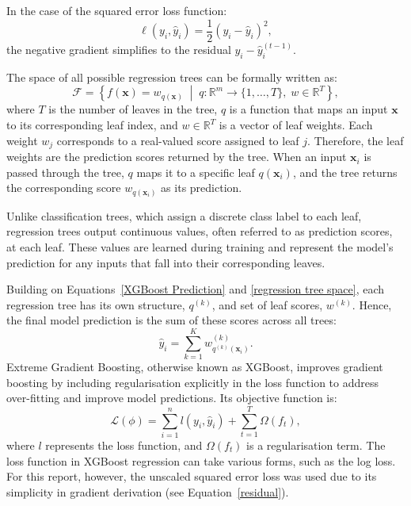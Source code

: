 \documentclass[11pt]{report} %
\begin{document}
\noindent In the case of the squared error loss function:
\begin{equation}
\ell(y_i, \hat{y}_i) = \frac{1}{2}(y_i - \hat{y}_i)^2,
\label{residual}
\end{equation}
the negative gradient simplifies to the residual \( y_i - \hat{y}_i^{(t-1)} \).


The space of all possible regression trees can be formally written as:
\begin{equation}
\mathcal{F} = \left\{ f(\mathbf{x}) = w_{q(\mathbf{x})} \;\middle|\; q : \mathbb{R}^m \rightarrow \{1, \dots, T\}, \; w \in \mathbb{R}^T \right\},
\label{regression tree space}
\end{equation}
where \( T \) is the number of leaves in the tree, \( q \) is a function that maps an input \( \mathbf{x} \) to its corresponding leaf index, and \( w \in \mathbb{R}^T \) is a vector of leaf weights.\cite{chen2016xgboost} Each weight \( w_j \) corresponds to a real-valued score assigned to leaf \( j \). Therefore, the leaf weights are the prediction scores returned by the tree. When an input \( \mathbf{x}_i \) is passed through the tree, \( q \) maps it to a specific leaf \( q(\mathbf{x}_i) \), and the tree returns the corresponding score \( w_{q(\mathbf{x}_i)} \) as its prediction. 

Unlike classification trees, which assign a discrete class label to each leaf, regression trees output continuous values, often referred to as prediction scores, at each leaf. These values are learned during training and represent the model’s prediction for any inputs that fall into their corresponding leaves.


Building on Equations~\ref{XGBoost Prediction} and \ref{regression tree space}, each regression tree has its own structure, \( q^{(k)} \), and set of leaf scores, \( w^{(k)} \).\cite{chen2016xgboost} Hence, the final model prediction is the sum of these scores across all trees:
\[
\hat{y}_i = \sum_{k=1}^K w^{(k)}_{q^{(k)}(\mathbf{x}_i)}.
\]
Extreme Gradient Boosting, otherwise known as XGBoost, improves gradient boosting by including regularisation explicitly in the loss function to address over-fitting and improve model predictions. Its objective function is:
\begin{equation}
    \mathcal{L}(\phi) = \sum_{i=1}^n l(y_i, \hat{y}_i) + \sum_{t=1}^T \Omega(f_t),
    \label{XGBoost Loss}
\end{equation}
where \( l \) represents the loss function, and \( \Omega(f_t) \) is a regularisation term.\cite{chen2016xgboost} The loss function in XGBoost regression can take various forms, such as the log loss. For this report, however, the unscaled squared error loss was used due to its simplicity in gradient derivation (see Equation~\ref{residual}). 
\end{document}
